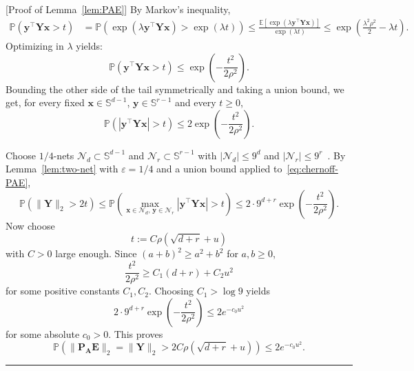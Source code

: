 \documentclass{article}
\newcommand{\twonorm}[1]{\|#1\|_2}
\newcommand{\Ex}[1]{\mbox{}\mathbb{E}\left[#1\right]}
\newcommand{\pr}[1]{\mbox{}\mathbb{P}\left(#1\right)}
\newcommand{\xb}{\mathbf{x}}
\newcommand{\yb}{\mathbf{y}}
\newcommand{\Ab}{\mathbf{A}}
\newcommand{\Eb}{\mathbf{E}}
\newcommand{\Pb}{\mathbf{P}}
\newcommand{\Yb}{\mathbf{Y}}
\newcommand{\BlackBox}{\rule{1.5ex}{1.5ex}}  %
\newenvironment{proof}{\par\noindent{\bf Proof\ }}{\hfill\BlackBox\par\medskip}
\newcommand{\rbr}[1]{\left(#1\right)}
\newcommand{\abr}[1]{\left|#1\right|}
\begin{document}
\begin{proof}[Proof of Lemma~\ref{lem:PAE}]
By Markov's inequality, \begin{align}
    \pr{\yb^\top \Yb \xb > t} &= \pr{\exp \rbr{\lambda \yb^\top \Yb \xb} > \exp \rbr{\lambda t}} \le \frac{\Ex{\exp(\lambda \yb^\top \Yb \xb)}}{ \exp \rbr{\lambda t}}\le \exp \rbr{  \frac{\lambda^2 \rho^2}{2} - \lambda t}.
\end{align}
Optimizing in $\lambda$ yields:
\begin{equation}
    \pr{\yb^\top \Yb \xb > t} \le \exp\rbr{-\frac{t^2}{2 \rho^2}}.
\end{equation}
Bounding the other side of the tail symmetrically and taking a union bound, we get,
for every fixed $\xb \in \mathbb{S}^{d-1}$, $\yb \in \mathbb{S}^{r-1}$ and every $t \ge 0$,
\begin{equation}\label{eq:chernoff-PAE}
    \pr{\abr{\yb^\top \Yb \xb} > t} \le 2 \exp\rbr{-\frac{t^2}{2 \rho^2}}.
\end{equation}

Choose $1/4$-nets $\mathcal{N}_d \subset \mathbb{S}^{d-1}$ and $\mathcal{N}_r \subset \mathbb{S}^{r-1}$ with $\abr{\mathcal{N}_d} \le 9^d$ and $\abr{\mathcal{N}_r} \le 9^r$~\citep[Corollary~4.2.11]{Vershynin_2026}. By Lemma~\ref{lem:two-net} with $\varepsilon = 1/4$ and a union bound applied to~\eqref{eq:chernoff-PAE},
\begin{equation*}
    \pr{\twonorm{\Yb} > 2t}
    \le \pr{\max_{\xb \in \mathcal{N}_d, \, \yb \in \mathcal{N}_r} \abr{\yb^\top \Yb \xb} > t}
    \le 2 \cdot 9^{d+r} \exp\rbr{-\frac{t^2}{2 \rho^2}}.
\end{equation*}
Now choose
\begin{equation*}
    t := C \rho \rbr{\sqrt{d+r} + u}
\end{equation*}
with $C > 0$ large enough. Since $(a+b)^2 \ge a^2 + b^2$ for $a, b \ge 0$,
\begin{equation*}
    \frac{t^2}{2 \rho^2} \ge C_1 (d+r) + C_2 u^2
\end{equation*}
for some positive constants $C_1, C_2$. Choosing $C_1 > \log 9$ yields
\begin{equation*}
    2 \cdot 9^{d+r} \exp\rbr{-\frac{t^2}{2 \rho^2}} \le 2 e^{-c_0 u^2}
\end{equation*}
for some absolute $c_0 > 0$. This proves
\begin{equation*}
    \pr{\twonorm{\Pb_\Ab \Eb} = \twonorm{\Yb} > 2 C \rho \rbr{\sqrt{d+r} + u}} \le 2 e^{-c_0 u^2}.
\end{equation*}
\end{proof}
\end{document}
